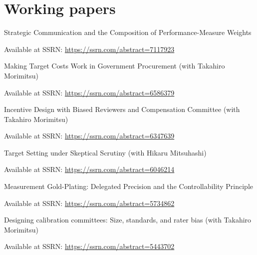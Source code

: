 \documentclass[letterpaper,11pt]{article}
\renewenvironment{itemize}{
  \begin{list}{}{
    \setlength{\leftmargin}{1.5em}
  }
}{
  \end{list}
}
\begin{document}
\section*{Working papers}

\begin{itemize}
    \item Strategic Communication and the Composition of Performance-Measure Weights
        \begin{itemize}
            \item Available at SSRN: \url{https://ssrn.com/abstract=7117923}
        \end{itemize}

    \item Making Target Costs Work in Government Procurement (with Takahiro Morimitsu)
        \begin{itemize}
            \item Available at SSRN: \url{https://ssrn.com/abstract=6586379}
        \end{itemize}

    \item Incentive Design with Biased Reviewers and Compensation Committee (with Takahiro Morimitsu)
        \begin{itemize}
            \item Available at SSRN: \url{https://ssrn.com/abstract=6347639}
        \end{itemize}

    \item Target Setting under Skeptical Scrutiny (with Hikaru Mitsuhashi)
        \begin{itemize}
            \item Available at SSRN: \url{https://ssrn.com/abstract=6046214}
        \end{itemize}

    \item Measurement Gold-Plating: Delegated Precision and the Controllability Principle
        \begin{itemize}
            \item Available at SSRN: \url{https://ssrn.com/abstract=5734862}
        \end{itemize}

    \item Designing calibration committees: Size, standards, and rater bias (with Takahiro Morimitsu)
        \begin{itemize}
            \item Available at SSRN: \url{https://ssrn.com/abstract=5443702}
        \end{itemize}


\end{itemize}
\end{document}
